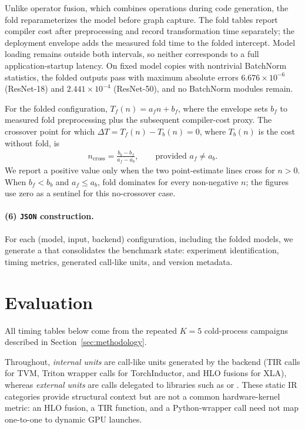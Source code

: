 \documentclass[sigconf]{acmart}
\DeclareRobustCommand{\tcode}[1]{\texttt{\seqsplit{#1}}}
\begin{document}
Unlike operator fusion, which combines operations during code generation, the fold reparameterizes the model before graph capture. The fold tables report compiler cost after preprocessing and record transformation time separately; the deployment envelope adds the measured fold time to the folded intercept. Model loading remains outside both intervals, so neither corresponds to a full application-startup latency. On fixed model copies with nontrivial BatchNorm statistics, the folded outputs pass \tcode{allclose(rtol=1e-3, atol=1e-4)} with maximum absolute errors \(6.676\times10^{-6}\) (ResNet-18) and \(2.441\times10^{-4}\) (ResNet-50), and no BatchNorm modules remain.

For the folded configuration, \(T_f(n)=a_f n+b_f\), where the envelope sets \(b_f\) to measured fold preprocessing plus the subsequent compiler-cost proxy. The crossover point for which $\Delta T = T_f(n) - T_b(n) = 0$, where $T_b(n)$ is the cost without fold, is
\begin{align*}
n_{\mathrm{cross}}
  = \frac{b_b - b_f}{a_f - a_b},
   \qquad \text{provided } a_f \neq a_b.
\end{align*}
We report a positive value only when the two point-estimate lines cross for \(n>0\). When \(b_f<b_b\) and \(a_f\leq a_b\), fold dominates for every non-negative \(n\); the figures use zero as a sentinel for this no-crossover case.

\paragraph{(6) \texttt{JSON} construction.}
For each (model, input, backend) configuration, including the folded models, we generate a \tcode{JSON} that consolidates the benchmark state: experiment identification, timing metrics, generated call-like units, and version metadata.

\section{Evaluation}

All timing tables below come from the repeated \(K=5\) cold-process
campaigns described in Section~\ref{sec:methodology}.

Throughout, \emph{internal units} are call-like units generated by the backend (TIR calls for TVM, Triton wrapper calls for TorchInductor, and HLO fusions for XLA), whereas \emph{external units} are calls delegated to libraries such as \tcode{cuDNN} or \tcode{cuBLAS}. These static IR categories provide structural context but are not a common hardware-kernel metric: an HLO fusion, a TIR function, and a Python-wrapper call need not map one-to-one to dynamic GPU launches.
\end{document}
